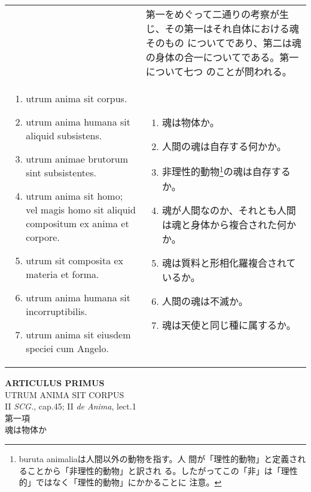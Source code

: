 \documentclass[10pt]{jsarticle} %
\begin{document}
\begin{longtable}{p{21em}p{21em}}
&

第一をめぐって二通りの考察が生じ、その第一はそれ自体における魂そのもの
 についてであり、第二は魂の身体の合一についてである。第一について七つ
 のことが問われる。

\\

\begin{enumerate}
 \item utrum anima sit corpus.
 \item utrum anima humana sit aliquid subsistens.
 \item utrum animae brutorum sint subsistentes.
 \item utrum anima sit homo; vel magis homo sit aliquid compositum ex anima et corpore.
 \item utrum sit composita ex materia et forma.
 \item utrum anima humana sit incorruptibilis.
 \item utrum anima sit eiusdem speciei cum Angelo.
\end{enumerate}

&

\begin{enumerate}
 \item 魂は物体か。
 \item 人間の魂は自存する何かか。
 \item 非理性的動物\footnote{buruta animaliaは人間以外の動物を指す。人
       間が「理性的動物」と定義されることから「非理性的動物」と訳され
       る。したがってこの「非」は「理性的」ではなく「理性的動物」にかかることに
       注意。}の魂は自存するか。
 \item 魂が人間なのか、それとも人間は魂と身体から複合された何かか。
 \item 魂は質料と形相化羅複合されているか。
 \item 人間の魂は不滅か。
 \item 魂は天使と同じ種に属するか。
\end{enumerate}

\end{longtable}

\newpage
{}
\begin{center}
{\Large {\bf ARTICULUS PRIMUS}}\\
{\large UTRUM ANIMA SIT CORPUS}\\
{\footnotesize II {\itshape SCG.}, cap.45; II {\itshape de Anima}, lect.1}\\
{\Large 第一項\\魂は物体か}
\end{center}
\end{document}
